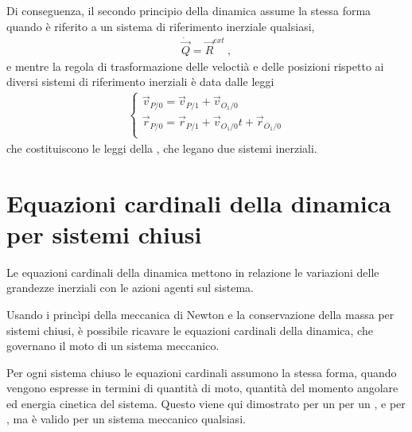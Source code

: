 \documentclass[letterpaper,10pt,italian]{jupyterBook}
\begin{document}
\sphinxAtStartPar
Di conseguenza, il secondo principio della dinamica assume la stessa forma quando è riferito a un sistema di riferimento inerziale qualsiasi,
\begin{equation*}
\begin{split}\dot{\vec{Q}} = \vec{R}^{ext} \ ,\end{split}
\end{equation*}
\sphinxAtStartPar
e mentre la regola di trasformazione delle veloctià e delle posizioni rispetto ai diversi sistemi di riferimento inerziali è data dalle leggi
\begin{equation*}
\begin{split}\begin{cases}
  \vec{v}_{P/0} = \vec{v}_{P/1} + \vec{v}_{O_1/0} \\
  \vec{r}_{P/0} = \vec{r}_{P/1} + \vec{v}_{O_1/0} t + \vec{r}_{O_1/0} \\
\end{cases}\end{split}
\end{equation*}
\sphinxAtStartPar
che costituiscono le leggi della , che legano due sistemi inerziali.

\sphinxstepscope


\section{Equazioni cardinali della dinamica per sistemi chiusi}
\label{\detokenize{ch/mechanics/dynamics-eom:equazioni-cardinali-della-dinamica-per-sistemi-chiusi}}\label{\detokenize{ch/mechanics/dynamics-eom:physics-hs-mechanics-dynamics-eom}}\label{\detokenize{ch/mechanics/dynamics-eom::doc}}
\sphinxAtStartPar
Le equazioni cardinali della dinamica mettono in relazione le variazioni delle grandezze inerziali con le azioni agenti sul sistema.

\sphinxAtStartPar
Usando i princìpi della meccanica di Newton e la conservazione della massa per sistemi chiusi, è possibile ricavare le equazioni cardinali della dinamica, che governano il moto di un sistema meccanico.

\sphinxAtStartPar
Per ogni sistema chiuso le equazioni cardinali assumono la stessa forma, quando vengono espresse in termini di quantità di moto, quantità del momento angolare ed energia cinetica del sistema. Questo viene qui dimostrato per un {\hyperref[\detokenize{ch/mechanics/dynamics-notes:physics-hs-mechanics-dynamics-eom-points}]{}} per un {\hyperref[\detokenize{ch/mechanics/dynamics-notes:physics-hs-mechanics-dynamics-eom-points}]{}}, e per {\hyperref[\detokenize{ch/mechanics/dynamics-notes:physics-hs-mechanics-dynamics-eom-rigid-2d}]{}} , ma è valido per un sistema meccanico qualsiasi.
\end{document}
